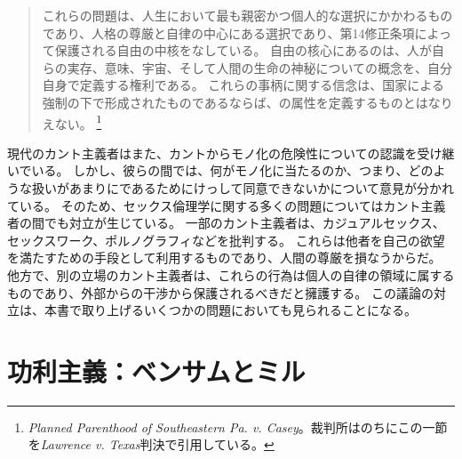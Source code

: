 \documentclass[paper=a4,book,openany]{jlreq}
\begin{document}
\begin{quote}
これらの問題は、人生において最も親密かつ個人的な選択にかかわるものであり、人格の尊厳と自律の中心にある選択であり、第14修正条項によって保護される自由の中核をなしている。
自由の核心にあるのは、人が自らの実存、意味、宇宙、そして人間の生命の神秘についての概念を、自分自身で定義する権利である。
これらの事柄に関する信念は、国家による強制の下で形成されたものであるならば、の属性を定義するものとはなりえない。
\footnote{\emph{Planned Parenthood of Southeastern Pa. v. Casey}。裁判所はのちにこの一節を\emph{Lawrence v. Texas}判決で引用している。}
\end{quote}

現代のカント主義者はまた、カントからモノ化の危険性についての認識を受け継いでいる。
しかし、彼らの間では、何がモノ化に当たるのか、つまり、どのような扱いがあまりにであるためにけっして同意できないかについて意見が分かれている。
そのため、セックス倫理学に関する多くの問題についてはカント主義者の間でも対立が生じている。
一部のカント主義者は、カジュアルセックス、セックスワーク、ポルノグラフィなどを批判する。
これらは他者を自己の欲望を満たすための手段として利用するものであり、人間の尊厳を損なうからだ。
他方で、別の立場のカント主義者は、これらの行為は個人の自律の領域に属するものであり、外部からの干渉から保護されるべきだと擁護する。
この議論の対立は、本書で取り上げるいくつかの問題においても見られることになる。
\section{功利主義：ベンサムとミル}
\end{document}
